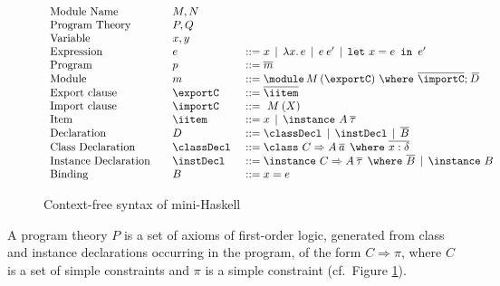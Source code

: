 \begin{figure} 
\begin{mdframed}
\[ \begin{array}[c]{llll}
\textrm{Module Name}        &              & M,N            & \\
\textrm{Program Theory}     &         & P,Q            &\\
\textrm{Variable}           &         & x, y           &\\
\textrm{Expression}         &         & e              & ::= x \,\mid\, \lambda x.\,e  \,\mid\, e\:e' \,\mid\, \mlet x = e\,\iin\,e'\\ 
\textrm{Program}            &         & p              & ::= \overline{m}\\
\textrm{Module}             &         & m              & ::= \module\, M\, (\exportC) \ \where\ \overline{\importC};\: \overline{\!D}\\
\textrm{Export clause}      &         & \exportC\      & ::= \overline{\iitem}\\
\textrm{Import clause}      &         & \importC\      & ::= \ M\: (X)\\
\textrm{Item}               &         & \iitem         & ::= x \,\mid\, \instance\ A\: \overline{\tau}\\ 
\textrm{Declaration}        &         & D              & ::= \classDecl \,\mid\, \instDecl \,\mid\, \overline{B}\\
\textrm{Class Declaration}  &         & \classDecl\    & ::= \class\ C \Rightarrow A\: \overline{a}\:\: \where\ \overline{x:\delta}\\
\textrm{Instance Declaration} &       & \instDecl\     & ::= \instance\ C \Rightarrow A\: \overline{\tau}\:\: \where\ \overline{B} 
                                                             \,\mid\, \instance\ B\\
\textrm{Binding}              &       & B              & ::= x = e 
\end{array} \] 
\end{mdframed} \vspace{-.2cm}
\caption{Context-free syntax of mini-Haskell}
\label{fig:mini-Haskell-context-free-syntax}
\end{figure}

A program theory $P$ is a set of axioms of first-order logic,
generated from class and instance declarations occurring in the
program, of the form $C \Rightarrow \pi$, where $C$ is a set of simple
constraints and $\pi$ is a simple constraint (cf.~Figure
\ref{fig:mini-Haskell-context-free-syntax}).

